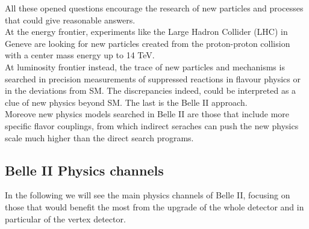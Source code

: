 All these opened questions encourage the research of new particles and processes that could give reasonable answers.\\
At the energy frontier, experiments like the Large Hadron Collider (LHC) in Geneve are looking for new particles created from the proton-proton collision with a center mass energy up to 14 TeV.\\
At luminosity frontier instead, the trace of new particles and mechanisms is searched in precision measurements of suppressed reactions in flavour physics or in the deviations from SM. The discrepancies indeed, could be interpreted as a clue of new physics beyond SM. The last is the Belle II approach.\\
Moreove new physics models searched in Belle II are those that include more specific flavor couplings, from which indirect seraches can push the new physics scale much higher than the direct search programs.


\subsection{Belle II Physics channels}

In the following we will see the main physics channels of Belle II, focusing on those that would benefit the most from the upgrade of the whole detector and in particular of the vertex detector.\\

\hspace{.2cm}

